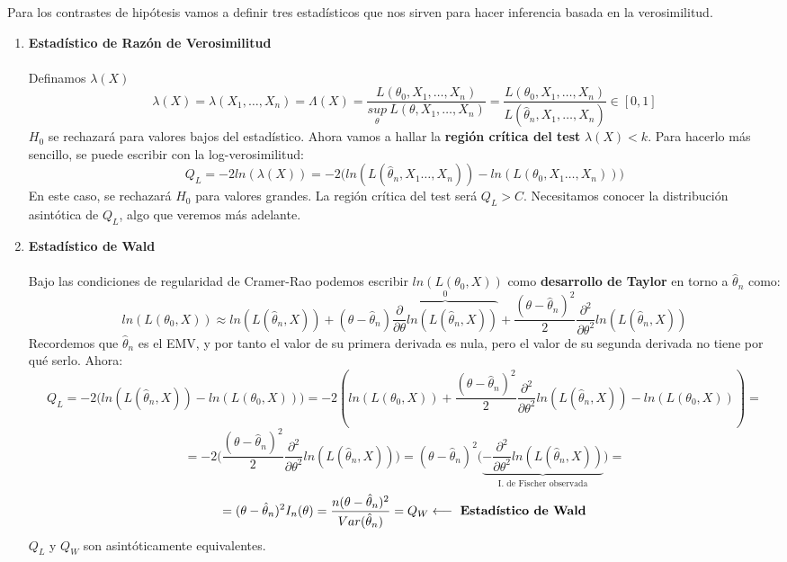 Para los contrastes de hipótesis vamos a definir tres estadísticos que nos sirven para hacer inferencia basada en la verosimilitud.
\begin{enumerate}
    \item \textbf{Estadístico de Razón de Verosimilitud}\\\ \\
    Definamos $\lambda (X)$
    $$\lambda (X)=\lambda (X_1,\dots ,X_n)=\Lambda (X)=\frac{L(\theta_0, X_1,\dots,X_n)}{\underset{\theta}{sup}\ L(\theta,X_1,\dots,X_n)}=\frac{L(\theta_0, X_1,\dots,X_n)}{L(\hat\theta_n, X_1,\dots,X_n)}\in [0,1]$$
    $H_0$ se rechazará para valores bajos del estadístico. 
    Ahora vamos a hallar la \textbf{región crítica del test} $\lambda (X)<k$. Para hacerlo más sencillo, se puede escribir con la log-verosimilitud:
    $$Q_L=-2ln(\lambda (X))=-2\big(ln(L(\hat\theta_n,X_1\dots,X_n))-ln(L(\theta_0,X_1\dots,X_n))\big)$$
    En este caso, se rechazará $H_0$ para valores grandes. La región crítica del test será $Q_L>C$. 
    Necesitamos conocer la distribución asintótica de $Q_L$, algo que veremos más adelante.

    \item \textbf{Estadístico de Wald}\\\ \\
    Bajo las condiciones de regularidad de Cramer-Rao podemos escribir $ln(L(\theta_0,X))$ como \textbf{desarrollo de Taylor} en torno a $\hat\theta_n$ como:
    $$ln(L(\theta_0,X))\approx ln(L(\hat\theta_n,X))+(\theta-\hat\theta_n)\overbrace{\frac{\partial}{\partial\theta}ln(L(\hat\theta_n,X))}^{0}+\frac{(\theta-\hat\theta_n)^2}{2}\frac{\partial^2}{\partial\theta^2}ln(L(\hat\theta_n,X))$$
    Recordemos que $\hat\theta_n$ es el EMV, y por tanto el valor de su primera derivada es nula, pero el valor de su segunda derivada no tiene por qué serlo.
Ahora:
    $$Q_L=-2\big(ln(L(\hat\theta_n,X))-ln(L(\theta_0,X))\big)=-2(ln(L(\theta_0,X))+\frac{(\theta-\hat\theta_n)^2}{2}\frac{\partial^2}{\partial\theta^2}ln(L(\hat\theta_n,X))-ln(L(\theta_0,X)))=$$
    $$=-2\Big(\frac{(\theta-\hat\theta_n)^2}{2}\frac{\partial^2}{\partial\theta^2}ln(L(\hat\theta_n,X))\Big)=(\theta-\hat\theta_n)^2\Big(\underbrace{-\frac{\partial^2}{\partial\theta^2}ln(L(\hat\theta_n,X))}_{\text{I. de Fischer observada}}\Big)=$$
    $$=(\theta-\hat\theta_n)^2I_n(\theta)=\frac{n(\theta-\hat\theta_n)^2}{Var(\hat\theta_n)}=Q_W\longleftarrow\text{ \textbf{Estadístico de Wald}}$$
    $Q_L$ y $Q_W$ son asintóticamente equivalentes.


\end{enumerate}

